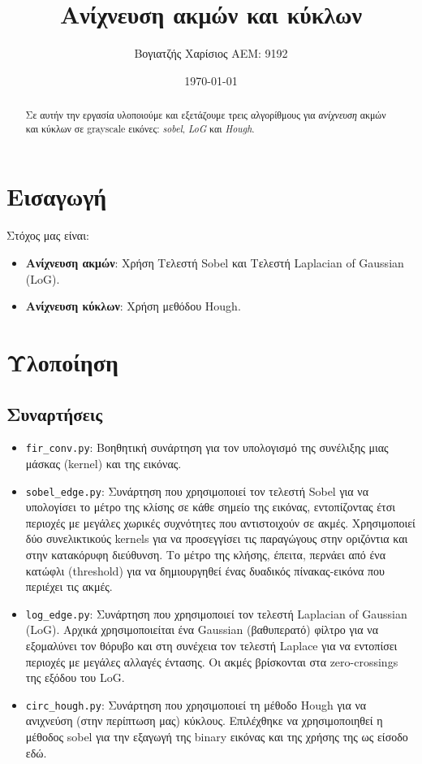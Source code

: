 \documentclass{article}
\title{Ανίχνευση ακμών και κύκλων}
\author{Βογιατζής Χαρίσιος ΑΕΜ: 9192}
\date{\today}
\begin{document}
\maketitle

\begin{abstract}
Σε αυτήν την εργασία υλοποιούμε και εξετάζουμε τρεις αλγορίθμους
για \emph{ανίχνευση} ακμών και κύκλων σε grayscale εικόνες:
\emph{sobel}, \emph{LoG} και \emph{Hough}.
\end{abstract}

\section{Εισαγωγή}
Στόχος μας είναι:
\begin{itemize}
  \item \textbf{Ανίχνευση ακμών}: Χρήση Τελεστή Sobel και Τελεστή Laplacian of Gaussian (LoG).
  \item \textbf{Ανίχνευση κύκλων}: Χρήση μεθόδου Hough.
\end{itemize}

\section{Υλοποίηση}

\subsection{Συναρτήσεις}
\begin{itemize}
  \item \texttt{\texttt{fir\_conv.py}}:
    Βοηθητική συνάρτηση για τον υπολογισμό της συνέλιξης μιας μάσκας (kernel) και της εικόνας.
  
  \item \texttt{sobel\_edge.py}:
    Συνάρτηση που χρησιμοποιεί τον τελεστή Sobel για να υπολογίσει το μέτρο της κλίσης σε κάθε σημείο της εικόνας, εντοπίζοντας έτσι περιοχές με μεγάλες χωρικές συχνότητες που αντιστοιχούν σε ακμές. Χρησιμοποιεί δύο συνελικτικούς kernels για να προσεγγίσει τις παραγώγους στην οριζόντια και στην κατακόρυφη διεύθυνση. Το μέτρο της κλήσης, έπειτα, περνάει από ένα κατώφλι (threshold) για να δημιουργηθεί ένας δυαδικός πίνακας-εικόνα που περιέχει τις ακμές.

  \item \texttt{\texttt{log\_edge.py}}:
    Συνάρτηση που χρησιμοποιεί τον τελεστή Laplacian of Gaussian (LoG). Αρχικά χρησιμοποιείται ένα Gaussian (βαθυπερατό) φίλτρο για να εξομαλύνει τον θόρυβο και στη συνέχεια τον τελεστή Laplace για να εντοπίσει περιοχές με μεγάλες αλλαγές έντασης. Οι ακμές βρίσκονται στα zero-crossings της εξόδου του LoG.

  \item \texttt{\texttt{circ\_hough.py}}:
    Συνάρτηση που χρησιμοποιεί τη μέθοδο Hough για να ανιχνεύση (στην περίπτωση μας) κύκλους. 
    Επιλέχθηκε να χρησιμοποιηθεί η μέθοδος sobel για την εξαγωγή της binary εικόνας και της χρήσης της ως είσοδο εδώ.
\end{itemize}
\end{document}
